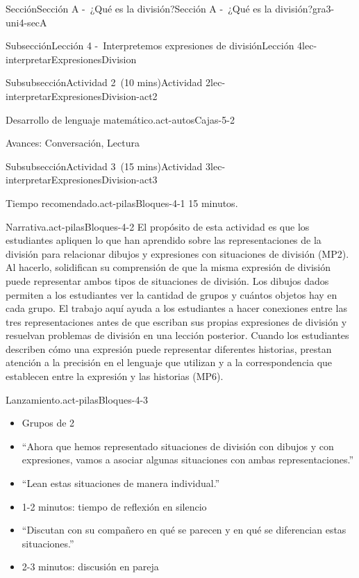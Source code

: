 \documentclass[oneside,10pt,]{article}
\begin{document}
\begin{sectionptx}{Sección}{Sección A -~¿Qué es la división?}{}{Sección A -~¿Qué es la división?}{}{}{gra3-uni4-secA}
\begin{subsectionptx}{Subsección}{Lección 4 -~Interpretemos expresiones de división}{}{Lección 4}{}{}{lec-interpretarExpresionesDivision}
\begin{subsubsectionptx}{Subsubsección}{Actividad 2~(10 mins)}{}{Actividad 2}{}{}{lec-interpretarExpresionesDivision-act2}
\begin{paragraphs}{Desarrollo de lenguaje matemático.}{act-autosCajas-5-2}
\par
Avances: Conversación, Lectura%
\end{paragraphs}%
\end{subsubsectionptx}
%
%
\typeout{************************************************}
\typeout{************************************************}
%
\begin{subsubsectionptx}{Subsubsección}{Actividad 3~(15 mins)}{}{Actividad 3}{}{}{lec-interpretarExpresionesDivision-act3}
\par
\begin{paragraphs}{Tiempo recomendado.}{act-pilasBloques-4-1}%
15 minutos.%
\end{paragraphs}%
\begin{paragraphs}{Narrativa.}{act-pilasBloques-4-2}%
El propósito de esta actividad es que los estudiantes apliquen lo que han aprendido sobre las representaciones de la división para relacionar dibujos y expresiones con situaciones de división (MP2). Al hacerlo, solidifican su comprensión de que la misma expresión de división puede representar ambos tipos de situaciones de división. Los dibujos dados permiten a los estudiantes ver la cantidad de grupos y cuántos objetos hay en cada grupo. El trabajo aquí ayuda a los estudiantes a hacer conexiones entre las tres representaciones antes de que escriban sus propias expresiones de división y resuelvan problemas de división en una lección posterior. Cuando los estudiantes describen cómo una expresión puede representar diferentes historias, prestan atención a la precisión en el lenguaje que utilizan y a la correspondencia que establecen entre la expresión y las historias (MP6).%
\end{paragraphs}%
\begin{paragraphs}{Lanzamiento.}{act-pilasBloques-4-3}%
%
\begin{itemize}[label=\textbullet]
\item{}Grupos de 2%
\item{}``Ahora que hemos representado situaciones de división con dibujos y con expresiones, vamos a asociar algunas situaciones con ambas representaciones.''%
\item{}``Lean estas situaciones de manera individual.''%
\item{}1-2 minutos: tiempo de reflexión en silencio%
\item{}``Discutan con su compañero en qué se parecen y en qué se diferencian estas situaciones.''%
\item{}2-3 minutos: discusión en pareja%

\end{itemize}
\end{paragraphs}
\end{subsubsectionptx}
\end{subsectionptx}
\end{sectionptx}
\end{document}
